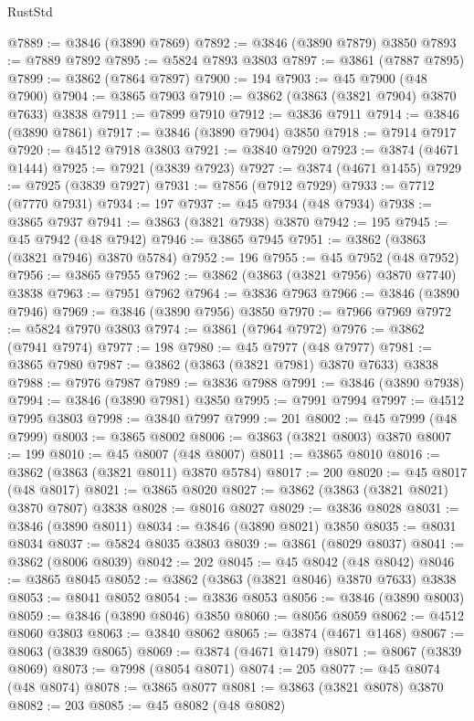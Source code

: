 \begin{lexlean}{RustStd}
\begin{coremodule}
@7889 := @3846 (@3890 @7869)
@7892 := @3846 (@3890 @7879) @3850
@7893 := @7889 @7892
@7895 := @5824 @7893 @3803
@7897 := @3861 (@7887 @7895)
@7899 := @3862 (@7864 @7897)
@7900 := 194
@7903 := @45 @7900 (@48 @7900)
@7904 := @3865 @7903
@7910 := @3862 (@3863 (@3821 @7904) @3870 @7633) @3838
@7911 := @7899 @7910
@7912 := @3836 @7911
@7914 := @3846 (@3890 @7861)
@7917 := @3846 (@3890 @7904) @3850
@7918 := @7914 @7917
@7920 := @4512 @7918 @3803
@7921 := @3840 @7920
@7923 := @3874 (@4671 @1444)
@7925 := @7921 (@3839 @7923)
@7927 := @3874 (@4671 @1455)
@7929 := @7925 (@3839 @7927)
@7931 := @7856 (@7912 @7929)
@7933 := @7712 (@7770 @7931)
@7934 := 197
@7937 := @45 @7934 (@48 @7934)
@7938 := @3865 @7937
@7941 := @3863 (@3821 @7938) @3870
@7942 := 195
@7945 := @45 @7942 (@48 @7942)
@7946 := @3865 @7945
@7951 := @3862 (@3863 (@3821 @7946) @3870 @5784)
@7952 := 196
@7955 := @45 @7952 (@48 @7952)
@7956 := @3865 @7955
@7962 := @3862 (@3863 (@3821 @7956) @3870 @7740) @3838
@7963 := @7951 @7962
@7964 := @3836 @7963
@7966 := @3846 (@3890 @7946)
@7969 := @3846 (@3890 @7956) @3850
@7970 := @7966 @7969
@7972 := @5824 @7970 @3803
@7974 := @3861 (@7964 @7972)
@7976 := @3862 (@7941 @7974)
@7977 := 198
@7980 := @45 @7977 (@48 @7977)
@7981 := @3865 @7980
@7987 := @3862 (@3863 (@3821 @7981) @3870 @7633) @3838
@7988 := @7976 @7987
@7989 := @3836 @7988
@7991 := @3846 (@3890 @7938)
@7994 := @3846 (@3890 @7981) @3850
@7995 := @7991 @7994
@7997 := @4512 @7995 @3803
@7998 := @3840 @7997
@7999 := 201
@8002 := @45 @7999 (@48 @7999)
@8003 := @3865 @8002
@8006 := @3863 (@3821 @8003) @3870
@8007 := 199
@8010 := @45 @8007 (@48 @8007)
@8011 := @3865 @8010
@8016 := @3862 (@3863 (@3821 @8011) @3870 @5784)
@8017 := 200
@8020 := @45 @8017 (@48 @8017)
@8021 := @3865 @8020
@8027 := @3862 (@3863 (@3821 @8021) @3870 @7807) @3838
@8028 := @8016 @8027
@8029 := @3836 @8028
@8031 := @3846 (@3890 @8011)
@8034 := @3846 (@3890 @8021) @3850
@8035 := @8031 @8034
@8037 := @5824 @8035 @3803
@8039 := @3861 (@8029 @8037)
@8041 := @3862 (@8006 @8039)
@8042 := 202
@8045 := @45 @8042 (@48 @8042)
@8046 := @3865 @8045
@8052 := @3862 (@3863 (@3821 @8046) @3870 @7633) @3838
@8053 := @8041 @8052
@8054 := @3836 @8053
@8056 := @3846 (@3890 @8003)
@8059 := @3846 (@3890 @8046) @3850
@8060 := @8056 @8059
@8062 := @4512 @8060 @3803
@8063 := @3840 @8062
@8065 := @3874 (@4671 @1468)
@8067 := @8063 (@3839 @8065)
@8069 := @3874 (@4671 @1479)
@8071 := @8067 (@3839 @8069)
@8073 := @7998 (@8054 @8071)
@8074 := 205
@8077 := @45 @8074 (@48 @8074)
@8078 := @3865 @8077
@8081 := @3863 (@3821 @8078) @3870
@8082 := 203
@8085 := @45 @8082 (@48 @8082)

\end{coremodule}
\end{lexlean}
